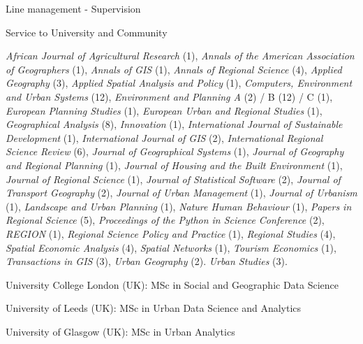 \documentclass[12pt,2up]{article}
\begin{document}
\begin{cv}{}
\begin{cvlist}{Line management - Supervision}
\end{cvlist}
\begin{cvlist}{Service to University and Community}

\item[\textbf{Journal Referee}]
    \item[]
  \emph{African Journal of Agricultural Research} (1),
  \emph{Annals of the American Association of Geographers} (1),
  \emph{Annals of GIS} (1),
  \emph{Annals of Regional Science} (4),
  \emph{Applied Geography} (3),
  \emph{Applied Spatial Analysis and Policy} (1),
  \emph{Computers, Environment and Urban Systems} (12),
  \emph{Environment and Planning A} (2) / B (12) / C (1),
  \emph{European Planning Studies} (1),
  \emph{European Urban and Regional Studies} (1),
  \emph{Geographical Analysis} (8),
  \emph{Innovation} (1),
  \emph{International Journal of Sustainable Development} (1),
  \emph{International Journal of GIS} (2),
  \emph{International Regional Science Review} (6),
  \emph{Journal of Geographical Systems} (1),
  \emph{Journal of Geography and Regional Planning} (1),
  \emph{Journal of Housing and the Built Environment} (1),
  \emph{Journal of Regional Science} (1),
  \emph{Journal of Statistical Software} (2),
  \emph{Journal of Transport Geography} (2),
  \emph{Journal of Urban Management} (1),
  \emph{Journal of Urbanism} (1),
  \emph{Landscape and Urban Planning} (1),
  \emph{Nature Human Behaviour} (1),
  \emph{Papers in Regional Science} (5),
  \emph{Proceedings of the Python in Science Conference} (2),
  \emph{REGION} (1),
  \emph{Regional Science Policy and Practice} (1),
  \emph{Regional Studies} (4),
  \emph{Spatial Economic Analysis} (4),
  \emph{Spatial Networks} (1),
  \emph{Tourism Economics} (1),
  \emph{Transactions in GIS} (3),
  \emph{Urban Geography} (2).
  \emph{Urban Studies} (3).


\item[\textbf{External Examination Experience}]

\item[2024-] University College London (UK): MSc in Social and Geographic Data
        Science
\item[2022-2025] University of Leeds (UK): MSc in Urban Data Science and Analytics
\item[2019-2023] University of Glasgow (UK): MSc in Urban Analytics

\item[\textbf{External Review/Panel Experience}]


\end{cvlist}
\end{cv}
\end{document}
